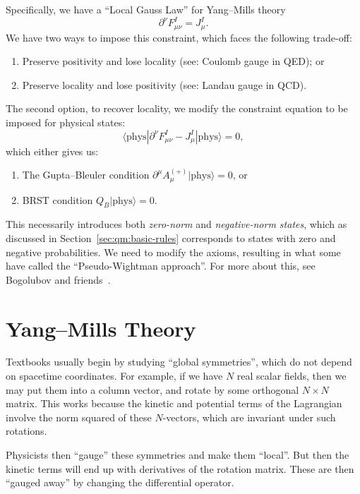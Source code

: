 Specifically, we have a ``Local Gauss Law'' for Yang--Mills theory
\begin{equation}
\partial^{\nu}F^{I}_{\mu\nu} = J^{I}_{\mu}.
\end{equation}
We have two ways to impose this constraint, which faces the following
trade-off:
\begin{enumerate}
\item Preserve positivity and lose locality (see: Coulomb gauge in QED); or
\item Preserve locality and lose positivity (see: Landau gauge in QCD).
\end{enumerate}
The second option, to recover locality, we modify the constraint
equation to be imposed for physical states:
\begin{equation}
\langle\mbox{phys}|\partial^{\nu}F^{I}_{\mu\nu} - J^{I}_{\mu}|\mbox{phys}\rangle=0,
\end{equation}
which either gives us:
\begin{enumerate}
\item The Gupta--Bleuler condition $\partial^{\mu}A_{\mu}^{(+)}|\mbox{phys}\rangle=0$,
or
\item BRST condition $Q_{B}|\mbox{phys}\rangle=0$.
\end{enumerate}
This necessarily introduces both \emph{zero-norm} and
\emph{negative-norm states}, which as discussed in
Section~\ref{sec:qm:basic-rules} corresponds to states with zero and
negative probabilities. We need to modify the axioms, resulting in
what some have called the ``Pseudo-Wightman approach''. For more about
this, see Bogolubov and friends~\cite{Bogolyubov:1990kw}.

\section{Yang--Mills Theory}

Textbooks usually begin by studying ``global symmetries'', which do not
depend on spacetime coordinates. For example, if we have $N$ real scalar
fields, then we may put them into a column vector, and rotate by some
orthogonal $N\times N$ matrix. This works because the kinetic and
potential terms of the Lagrangian involve the norm squared of these
$N$-vectors, which are invariant under such rotations.

Physicists then ``gauge'' these symmetries and make them ``local''. But
then the kinetic terms will end up with derivatives of the rotation
matrix. These are then ``gauged away'' by changing the differential
operator.

